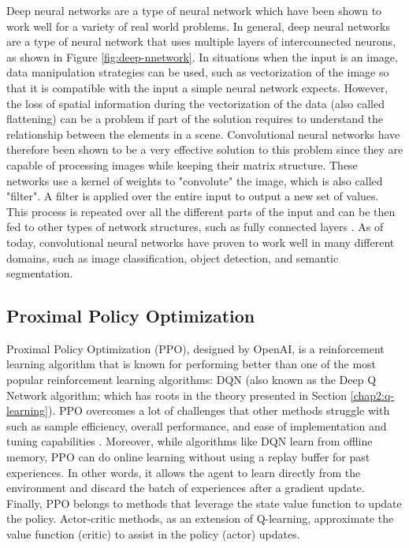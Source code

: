 Deep neural networks are a type of neural network which have been shown to work well for a variety of real world problems. In general, deep neural networks are a type of neural network that uses multiple layers of interconnected neurons, as shown in Figure \ref{fig:deep-nnetwork}. 
In situations when the input is an image, data manipulation strategies can be used, such as vectorization of the image so that it is compatible with the input a simple neural network expects. However, the loss of spatial information during the vectorization of the data (also called flattening) can be a problem if part of the solution requires to understand the relationship between the elements in a scene. Convolutional neural networks have therefore been shown to be a very effective solution to this problem since they are capable of processing images while keeping their matrix structure. These networks use a kernel of weights to "convolute" the image, which is also called "filter". A filter is applied over the entire input to output a new set of values. This process is repeated over all the different parts of the input and can be then fed to other types of network structures, such as fully connected layers \cite{eriksson2021deep}.
As of today, convolutional neural networks have proven to work well in many different domains, such as image classification, object detection, and semantic segmentation.


\subsection{Proximal Policy Optimization}\label{chap2:ppo}
Proximal Policy Optimization (PPO), designed by OpenAI, is a reinforcement learning algorithm that is known for performing better than one of the most popular reinforcement learning algorithms: DQN (also known as the Deep Q Network algorithm; which has roots in the theory presented in Section \ref{chap2:q-learning}).
PPO overcomes a lot of challenges that other methods struggle with such as sample efficiency, overall performance, and ease of implementation and tuning capabilities \cite{schulman2017proximal}. %
Moreover, while algorithms like DQN learn from offline memory, PPO can do online learning without using a replay buffer for past experiences. In other words, it allows the agent to learn directly from the environment and discard the batch of experiences after a gradient update. 
Finally, PPO belongs to methods that leverage the state value function to update the policy. Actor-critic methods, as an extension of Q-learning, approximate the value function (critic) to assist in the policy (actor) updates.

